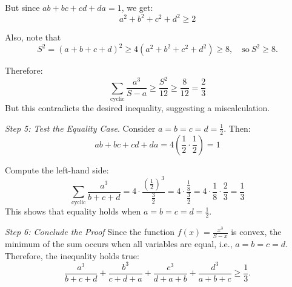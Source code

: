 \begin{tcolorbox}[breakable, enhanced, colback=black!5!white, colframe=black!75!white,  title=A Failed Case of OpenAI o1-preview]
{But since \(ab + bc + cd + da = 1\), we get:
\[
a^2 + b^2 + c^2 + d^2 \geq 2
\]

{\color{red} Also, note that 
\[
S^2 = (a + b + c + d)^2 \geq 4(a^2 + b^2 + c^2 + d^2) \geq 8, \quad \text{so} \ S^2 \geq 8.
\]

Therefore:
\[
\sum_{\text{cyclic}} \frac{a^3}{S - a} \geq \frac{S^2}{12} \geq \frac{8}{12} = \frac{2}{3}
\]
But this contradicts the desired inequality, suggesting a miscalculation.}

\emph{Step 5: Test the Equality Case}.
Consider \(a = b = c = d = \frac{1}{2}\). Then:
\[
ab + bc + cd + da = 4\left(\frac{1}{2} \cdot \frac{1}{2}\right) = 1
\]

Compute the left-hand side:
\[
\sum_{\text{cyclic}} \frac{a^3}{b+c+d} = 4 \cdot \frac{\left(\frac{1}{2}\right)^3}{\frac{3}{2}} = 4 \cdot \frac{\frac{1}{8}}{\frac{3}{2}} = 4 \cdot \frac{1}{8} \cdot \frac{2}{3} = \frac{1}{3}
\]
This shows that equality holds when \(a = b = c = d = \frac{1}{2}\).

\emph{Step 6: Conclude the Proof}
Since the function \(f(x) = \frac{x^3}{S - x}\) is convex, the minimum of the sum occurs when all variables are equal, i.e., \(a = b = c = d\). Therefore, the inequality holds true:
\[
\frac{a^3}{b+c+d} + \frac{b^3}{c+d+a} + \frac{c^3}{d+a+b} + \frac{d^3}{a+b+c} \geq \frac{1}{3}.
\]

}
\end{tcolorbox}